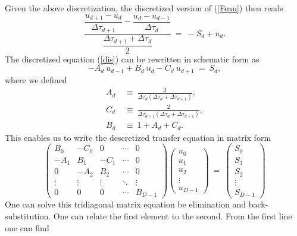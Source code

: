 \documentclass[]{article}
\begin{document}
Given the above discretization, the discretized version of (\ref{Feau}) then reads
\begin{equation}
\frac{\dfrac{u_{d+1}-u_{d}}{\Delta\tau_{d+1}}-\dfrac{u_{d}-u_{d-1}}{\Delta\tau_{d}}}{\dfrac{\Delta\tau_{d+1}+\Delta\tau_{d}}{2}} \ = \ - S_{d} + u_{d} .
\label{dis}
\end{equation}
The discretized equation (\ref{dis}) can be rewritten in schematic form as
\begin{equation}
-A_{d} \ u_{d-1} + B_{d} \ u_{d} - C_{d} \ u_{d+1} \ = \ S_{d},
\label{rec}
\end{equation}
where we defined
\begin{equation}
\begin{split}
A_{d} \ &\equiv \ \frac{2}{\Delta\tau_{d} (\Delta\tau_{d} + \Delta\tau_{d+1}) } , \\
C_{d} \ &\equiv \ \frac{2}{\Delta\tau_{d+1} (\Delta\tau_{d} + \Delta\tau_{d+1})} , \\
B_{d} \ &\equiv \ 1  + A_{d} + C_{d} .
\end{split}
\end{equation}
This enables us to write the descretized transfer equation in matrix form
\begin{equation}
\left( \begin{matrix}
B_{0} & -C_{0} & 0 & \cdots & 0 \\
-A_{1} & B_{1} & -C_{1} & \cdots & 0 \\
0 & -A_{2} & B_{2} & \cdots & 0 \\
\vdots & \vdots & \vdots & \ddots & \vdots \\
0 & 0 & 0 & \cdots & B_{D-1}
\end{matrix}\right)
\left( \begin{matrix}
u_{0} \\ u_{1} \\ u_{2} \\ \vdots \\ u_{D-1}
\end{matrix}\right) \ = \ \left( \begin{matrix}
S_{0} \\ S_{1} \\ S_{2} \\ \vdots \\ S_{D-1}
\end{matrix}\right)
\label{mateq}
\end{equation}
One can solve this tridiagonal matrix equation be elimination and back-substitution. One can relate the first element to the second. From the first line one can find
\end{document}
